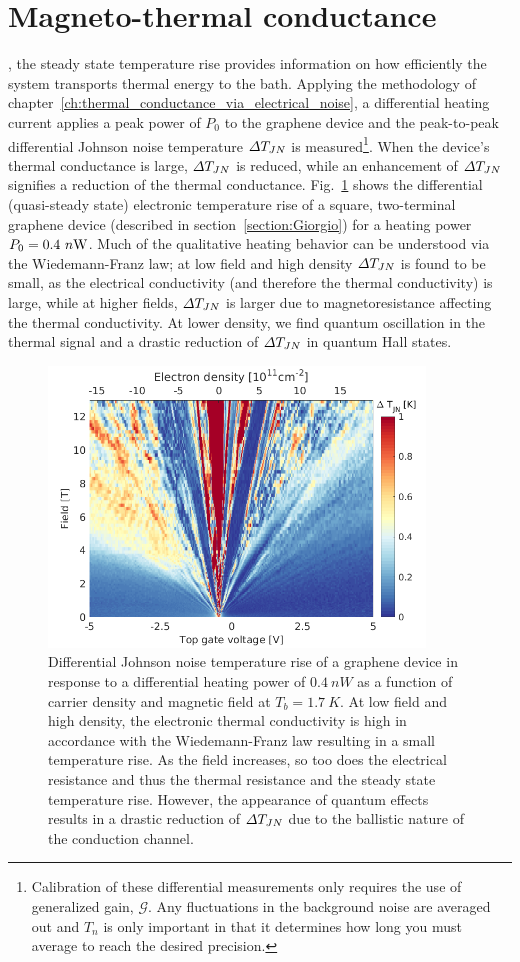 \section{Magneto-thermal conductance}
\label{section:magneto-thermal_conductance}
, the steady state temperature rise provides information on how efficiently the system transports thermal energy to the bath. Applying the methodology of chapter~\ref{ch:thermal_conductance_via_electrical_noise}, a differential heating current applies a peak power of $P_0$ to the graphene device and the peak-to-peak differential Johnson noise temperature $\Delta T_{JN}$ is measured\footnote{Calibration of these differential measurements only requires the use of generalized gain, $\mathcal{G}$. Any fluctuations in the background noise are averaged out and $T_n$ is only important in that it determines how long you must average to reach the desired precision.}. When the device's thermal conductance is large, $\Delta T_{JN}$ is reduced, while an enhancement of $\Delta T_{JN}$ signifies a reduction of the thermal conductance. Fig.~\ref{fig:m_DT} shows the differential (quasi-steady state) electronic temperature rise of a square, two-terminal graphene device (described in section~\ref{section:Giorgio}) for a heating power $P_0 = 0.4~n\mathrm{W}$. Much of the qualitative heating behavior can be understood via the Wiedemann-Franz law; at low field and high density $\Delta T_{JN}$ is found to be small, as the electrical conductivity (and therefore the thermal conductivity) is large, while at higher fields, $\Delta T_{JN}$ is larger due to magnetoresistance affecting the thermal conductivity. At lower density, we find quantum oscillation in the thermal signal and a drastic reduction of $\Delta T_{JN}$ in quantum Hall states.
\begin{figure}
\centering
\includegraphics[width=100mm]{figures/magneto/Fan_DT.png}
\caption{Differential Johnson noise temperature rise of a graphene device in response to a differential heating power of $0.4~nW$ as a function of carrier density and magnetic field at $T_b=1.7~K$. At low field and high density, the electronic thermal conductivity is high in accordance with the Wiedemann-Franz law resulting in a small temperature rise. As the field increases, so too does the electrical resistance and thus the thermal resistance and the steady state temperature rise. However, the appearance of quantum effects results in a drastic reduction of $\Delta T_{JN}$ due to the  ballistic nature of the conduction channel.}
\label{fig:m_DT}
\end{figure}

